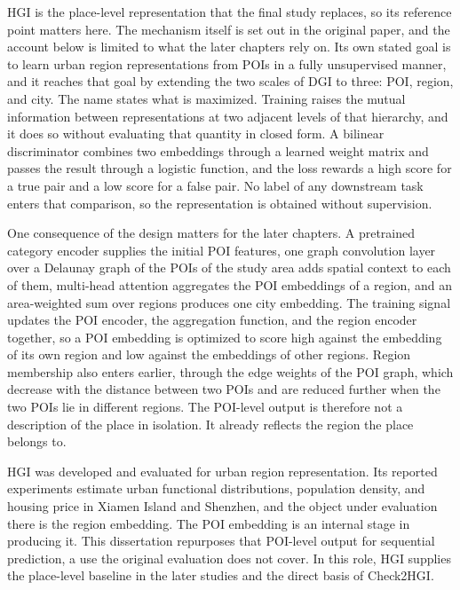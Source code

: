 HGI is the place-level representation that the final study replaces, so its reference
point matters here. The mechanism itself is set out in the original paper, and the
account below is limited to what the later chapters rely on. Its own stated goal is to
learn urban region representations from POIs in a fully unsupervised manner, and it
reaches that goal by extending the two scales of DGI to three: POI, region, and city.
The name states what is maximized. Training raises the mutual information between
representations at two adjacent levels of that hierarchy, and it does so without
evaluating that quantity in closed form. A bilinear discriminator combines two
embeddings through a learned weight matrix and passes the result through a logistic
function, and the loss rewards a high score for a true pair and a low score for a
false pair. No label of any downstream task enters that comparison, so the
representation is obtained without supervision.

One consequence of the design matters for the later chapters. A pretrained category
encoder supplies the initial POI features, one graph convolution layer over a Delaunay
graph of the POIs of the study area adds spatial context to each of them, multi-head
attention aggregates the POI embeddings of a region, and an area-weighted sum over
regions produces one city embedding. The training signal updates the POI encoder, the
aggregation function, and the region encoder together, so a POI embedding is optimized
to score high against the embedding of its own region and low against the embeddings
of other regions. Region membership also enters earlier, through the edge weights of
the POI graph, which decrease with the distance between two POIs and are reduced
further when the two POIs lie in different regions. The POI-level output is therefore
not a description of the place in isolation. It already reflects the region the place
belongs to.

HGI was developed and evaluated for urban region representation. Its reported
experiments estimate urban functional distributions, population density, and housing
price in Xiamen Island and Shenzhen, and the object under evaluation there is the
region embedding. The POI embedding is an internal stage in producing it. This
dissertation repurposes that POI-level output for sequential prediction, a use the
original evaluation does not cover. In this role, HGI supplies the place-level
baseline in the later studies and the direct basis of Check2HGI.

